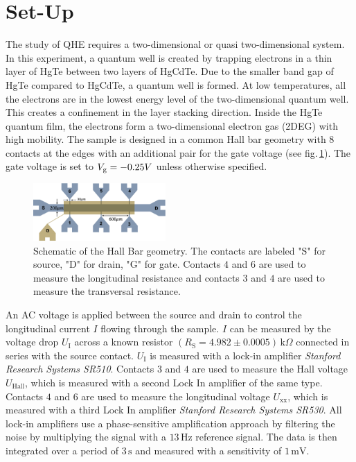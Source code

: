 \section{Set-Up}\label{sec:setup}
The study of QHE requires a two-dimensional or quasi two-dimensional system.
In this experiment, a quantum well is created by trapping electrons in a thin layer of HgTe between two layers of HgCdTe. Due to the smaller band gap of HgTe compared to HgCdTe, a quantum well is formed. 
At low temperatures, all the electrons are in the lowest energy level of the two-dimensional quantum well. This creates a confinement in the layer stacking direction.
Inside the HgTe quantum film, the electrons form a two-dimensional electron gas (2DEG) with high mobility.
The sample is designed in a common Hall bar geometry with $8$ contacts at the edges with an additional pair for the gate voltage (see fig.\,\ref{fig:HallBar}).
The gate voltage is set to $V_\text g = -0.25V$ unless otherwise specified.
\begin{figure}[h]
    \centering
    \includegraphics[width=0.45\textwidth]{../Images/HallBar.png}
    \caption{Schematic of the Hall Bar geometry. The contacts are labeled "S" 
    for source, "D" for drain, "G" for gate. Contacts $4$ and $6$ are used to 
    measure the longitudinal resistance and contacts $3$ and $4$ are used to measure 
    the transversal resistance.}
    \label{fig:HallBar}
\end{figure}
An AC voltage is applied between the source and drain to control the longitudinal current $I$ flowing through the sample. 
$I$ can be measured by the voltage drop $U_\text{I}$ across a known resistor 
$(R_\text{S}=4.982\pm0.0005)\,\text{k}\Omega$ connected in series with the source contact. 
$U_\text{I}$ is measured with a lock-in amplifier \emph{Stanford Research Systems SR510}. 
Contacts $3$ and $4$ are used to measure the Hall voltage $U_\text{Hall}$, which is measured with a second Lock In amplifier of the same type. 
Contacts $4$ and $6$ are used to measure the longitudinal voltage $U_\text{xx}$, which is measured with a third Lock In amplifier \emph{Stanford Research Systems SR530}.
All lock-in amplifiers use a phase-sensitive amplification approach by filtering the noise by multiplying the signal with a $13\,\text{Hz}$ reference signal. The data is then integrated over a period of $3\,\text{s}$ and measured with a sensitivity of $1\,\text{mV}$.
